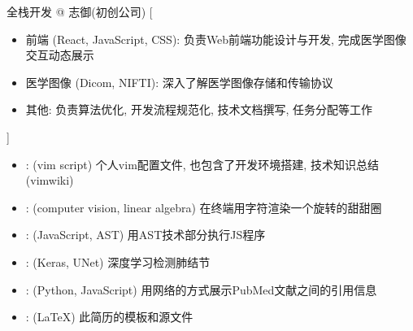 \documentclass[zh]{resume}
\begin{document}
\begin{experiences}
    {全栈开发 @ 志御(初创公司)}%
    [\begin{itemize}
      \item{前端 (React, JavaScript, CSS): 负责Web前端功能设计与开发, 完成医学图像交互动态展示}
      \item{医学图像 (Dicom, NIFTI): 深入了解医学图像存储和传输协议}
      \item{其他: 负责算法优化, 开发流程规范化, 技术文档撰写, 任务分配等工作}
    \end{itemize}]
\end{experiences}


\begin{itemize}
  \item {}:
    (vim script)
    个人vim配置文件, 也包含了开发环境搭建, 技术知识总结(vimwiki)
  \item {}:
    (computer vision, linear algebra)
    在终端用字符渲染一个旋转的甜甜圈
  \item {}:
    (JavaScript, AST)
    用AST技术部分执行JS程序
  \item {}:
    (Keras, UNet)
    深度学习检测肺结节
  \item {}:
    (Python, JavaScript)
    用网络的方式展示PubMed文献之间的引用信息
  \item {}:
    (\LaTeX)
    此简历的模板和源文件
\end{itemize}
\end{document}
